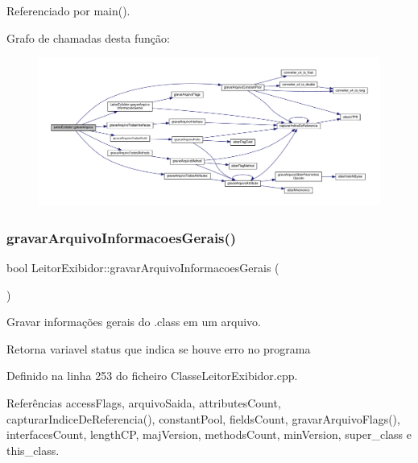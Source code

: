 Referenciado por main().

Grafo de chamadas desta função\+:
\nopagebreak
\begin{figure}[H]
\begin{center}
\leavevmode
\includegraphics[width=350pt]{classLeitorExibidor_a8dcf6961e13ad6830f62e7839448b235_cgraph}
\end{center}
\end{figure}
\mbox{\label{classLeitorExibidor_ab65aba73916cc733df269b3033522a3c}} 
\subsubsection{\texorpdfstring{gravar\+Arquivo\+Informacoes\+Gerais()}{gravarArquivoInformacoesGerais()}}
{\footnotesize\ttfamily bool Leitor\+Exibidor\+::gravar\+Arquivo\+Informacoes\+Gerais (\begin{DoxyParamCaption}{ }\end{DoxyParamCaption})}



Gravar informações gerais do .class em um arquivo. 

\begin{DoxyReturn}{Retorna}
variavel status que indica se houve erro no programa 
\end{DoxyReturn}


Definido na linha 253 do ficheiro Classe\+Leitor\+Exibidor.\+cpp.



Referências access\+Flags, arquivo\+Saida, attributes\+Count, capturar\+Indice\+De\+Referencia(), constant\+Pool, fields\+Count, gravar\+Arquivo\+Flags(), interfaces\+Count, length\+CP, maj\+Version, methods\+Count, min\+Version, super\+\_\+class e this\+\_\+class.



